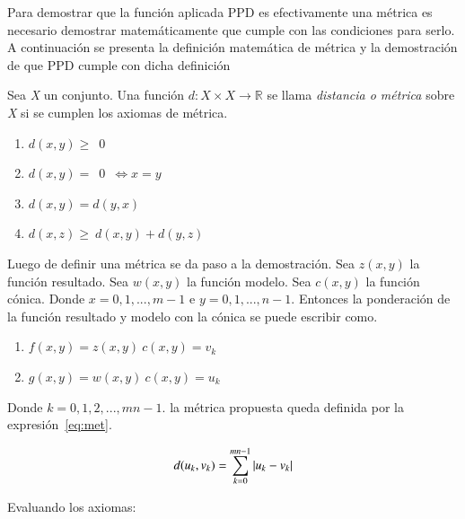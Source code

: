 Para demostrar que la función aplicada PPD es efectivamente una métrica es necesario demostrar matemáticamente que cumple con las condiciones para serlo. A continuación se presenta la definición matemática de métrica y la demostración de que PPD cumple con dicha definición

Sea \textit{X} un conjunto. Una función \(d:X\times X\rightarrow \mathbb{R}\) se llama \textit{distancia o métrica} sobre \textit{X} si se cumplen los axiomas de métrica.

\begin{enumerate}
\item \(d(x,y)\geq\)~0
\item \(d(x,y) = \)~0~\(\Leftrightarrow x=y\)
\item \(d(x,y)=d(y,x)\)
\item \(d(x,z)\geq~d(x,y)+d(y,z)\)
\end{enumerate}

Luego de definir una métrica se da paso a la demostración. Sea \(z(x,y)\) la función resultado. Sea \(w(x,y)\) la función modelo. Sea \(c(x,y)\) la función cónica. Donde \(x = 0,1,...,m-1\) e \(y = 0,1,...,n-1\). Entonces la ponderación de la función resultado y modelo con la cónica se puede escribir como.


\begin{enumerate}
\item \(f(x,y) = z(x,y)\ c(x,y) = v_{k}\)
\item \(g(x,y) = w(x,y)\ c(x,y) = u_{k}\)
\end{enumerate}

Donde \(k = 0, 1, 2, ..., mn-1.\) la métrica propuesta queda definida por la expresión~\ref{eq:met}.

\begin{equation}
\centering
\label{eq:met}
 d(u_{k},v_{k})=\sum_{k=0}^{mn-1} \left | u_{k}- v_{k}\right |
\end{equation}

Evaluando los axiomas:
 

